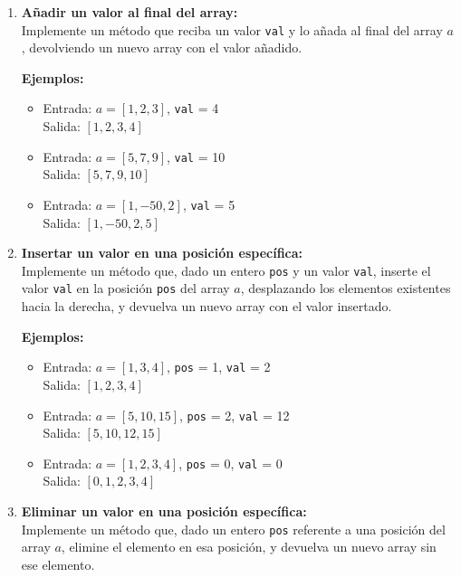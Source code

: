 \begin{enumerate}[label=\alph*)]
    \item \textbf{Añadir un valor al final del array:} \\
    Implemente un método que reciba un valor \texttt{val} y lo añada al final del array \(a\), devolviendo un nuevo array con el valor añadido.
    
    \textbf{Ejemplos:}
    \begin{itemize}
        \item Entrada: \(a = [1, 2, 3]\), \texttt{val} = 4 \\
        Salida: \([1, 2, 3, 4]\)
        \item Entrada: \(a = [5, 7, 9]\), \texttt{val} = 10 \\
        Salida: \([5, 7, 9, 10]\)
        \item Entrada: \(a = [1, -50, 2]\), \texttt{val} = 5 \\
        Salida: \([1, -50, 2, 5]\)
    \end{itemize}

    \item \textbf{Insertar un valor en una posición específica:} \\
    Implemente un método que, dado un entero \texttt{pos} y un valor \texttt{val}, inserte el valor \texttt{val} en la posición \texttt{pos} del array \(a\), desplazando los elementos existentes hacia la derecha, y devuelva un nuevo array con el valor insertado.
    
    \textbf{Ejemplos:}
    \begin{itemize}
        \item Entrada: \(a = [1, 3, 4]\), \texttt{pos} = 1, \texttt{val} = 2 \\
        Salida: \([1, 2, 3, 4]\)
        \item Entrada: \(a = [5, 10, 15]\), \texttt{pos} = 2, \texttt{val} = 12 \\
        Salida: \([5, 10, 12, 15]\)
        \item Entrada: \(a = [1, 2, 3, 4]\), \texttt{pos} = 0, \texttt{val} = 0 \\
        Salida: \([0, 1, 2, 3, 4]\)
    \end{itemize}

    \item \textbf{Eliminar un valor en una posición específica:} \\
    Implemente un método que, dado un entero \texttt{pos} referente a una posición del array \(a\), elimine el elemento en esa posición, y devuelva un nuevo array sin ese elemento.
    

\end{enumerate}
